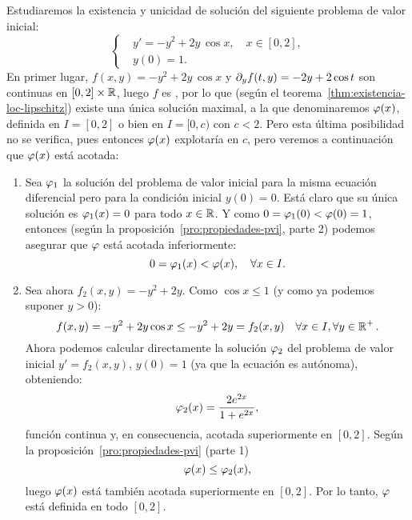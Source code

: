 \begin{example}
  \renewcommand{\tt}{x}
  \label{ex:existencia-unicidad-loc-lipschitz}
  Estudiaremos la existencia y unicidad de solución del siguiente
  problema de valor inicial:
  \begin{equation*}
    \left\{
      \begin{aligned}
        &y' = -y^2+2y\,\cos \tt, \quad \tt\in [0,2],\\
        &y(0)=1.
      \end{aligned}
    \right.
  \end{equation*}
  En primer lugar, $f(x,y)=-y^2+2y\,\cos \tt$ y $\partial_y f(t,y)=-2y+2\cos
  t$ son continuas en $[0,2]\times\operatorname{{\mathbb R}}$, luego $f$ es \locLipschitz,
  por lo que (según el teorema~\ref{thm:existencia-loc-lipschitz})
  existe una única solución maximal, a la que denominaremos
  $\sol(\tt)$, definida en $I=[0,2]$ o bien en $I=[0,c)$ con
  $c<2$. Pero esta última posibilidad no se verifica, pues entonces
  $\sol(\tt)$ explotaría en $c$, pero veremos a continuación que
  $\sol(\tt)$ está acotada:
  \begin{enumerate}
  \item Sea $\varphi_1$ la solución del problema de valor inicial para la
    misma ecuación diferencial pero para la condición inicial
    $y(0)=0$. Está claro que su única solución es $\sol_1(\tt)=0$
    para todo $\tt\in\Rset$. Y como $0=\varphi_1(0)<\varphi(0)=1$, entonces
    (según la proposición~\ref{pro:propiedades-pvi}, parte 2) podemos
    asegurar que $\varphi$ está acotada inferiormente:
    \begin{equation*}
      0=\sol_1(\tt)<\sol(\tt), \quad \forall \tt\in I.
    \end{equation*}
  \item Sea ahora $f_2(\tt,y)=-y^2+2y$. Como $\cos\tt \le 1$  (y como
    ya podemos suponer $y>0$):
    $$f(\tt,y)=-y^2+2y\cos\tt \le -y^2+2y = f_2(\tt,y)\quad
    \forall \tt\in I, \forall y\in\Rset^+.$$
    Ahora podemos calcular
    directamente la solución $\varphi_2$ del problema de valor inicial
    $y'=f_2(\tt,y)$, $y(0)=1$ (ya que la ecuación es autónoma),
    obteniendo:
    $$
    \sol_2(\tt)=\frac{2e^{2\tt}}{1+e^{2\tt}},
    $$
    función continua y, en consecuencia, acotada superiormente en $[0,2]$.
    Según la proposición~\ref{pro:propiedades-pvi} (parte 1)
    \begin{equation*}
      \sol(\tt)\le\sol_2(\tt),
    \end{equation*}
    luego $\sol(\tt)$ está también acotada superiormente en
    $[0,2]$. Por lo tanto, $\varphi$ está definida en todo $[0,2]$.
  \end{enumerate}
  \renewcommand{\tt}{t}
\end{example}

